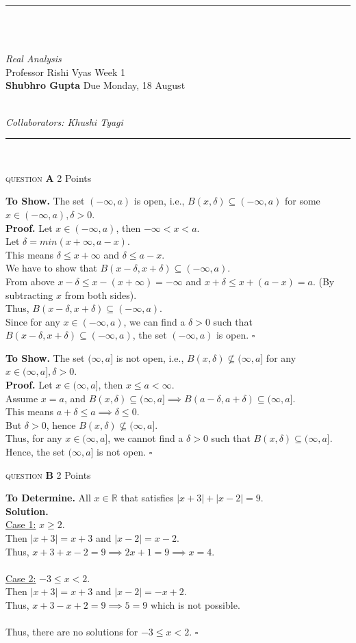 \documentclass[11pt]{article}
\newcommand{\problem
}[2]{
\begin{mdframed}
    \textsc{question} \textbf{#1} \hfill #2
\end{mdframed}
}
\newcommand{\heading}[5]{
\hrule ~\\~\\
\begin{large}
\noindent\emph{#1}\smallskip ~\\
Professor #3 \hfill Week #2 \smallskip ~\\
\textbf{Shubhro Gupta} \hfill Due #4 ~\\
\end{large} \medskip ~\\
{\emph{Collaborators: #5}}~\\
\hrule
\vspace{50pt}
~\\
}
\begin{document}
\heading{Real Analysis}{1}{Rishi Vyas}{Monday, 18 August}{Khushi Tyagi}

\problem{A}{2 Points}
\textbf{To Show.} The set $(- \infty, a)$ is open, i.e., $B(x, \delta) \subseteq (- \infty, a)$ for some $ x \in (- \infty, a), \delta > 0$.\\
\textbf{Proof.} Let $x \in (- \infty, a)$, then $- \infty < x < a$.\\
Let $\delta = min(x + \infty, a - x)$.\\
This means $\delta \leq x + \infty$ and $\delta \leq a - x$.\\
We have to show that $B(x - \delta, x + \delta) \subseteq (- \infty, a)$.\\
From above $x - \delta \leq x  - (x + \infty) = - \infty$ and $x + \delta \leq x + (a - x) = a$. (By subtracting $x$ from both sides).\\
Thus, $B(x - \delta, x + \delta) \subseteq (- \infty, a)$.\\
Since for any $x \in (- \infty, a)$, we can find a $\delta > 0$ such that $B(x - \delta, x + \delta) \subseteq (- \infty, a)$, the set $(- \infty, a)$ is open. \hfill $\square$\\
\vspace{10pt}

\noindent \textbf{To Show.} The set $(\infty, a]$ is not open, i.e., $B(x, \delta) \not\subseteq (\infty, a]$ for any $ x \in (\infty, a], \delta > 0$.\\
\textbf{Proof.} Let $x \in (\infty, a]$, then $x \leq a < \infty$.\\
Assume $x = a$, and $B(x, \delta) \subseteq (\infty, a] \implies B(a - \delta, a + \delta) \subseteq (\infty, a]$.\\
This means $a + \delta \leq a \implies \delta \leq 0$.\\
But $\delta > 0$, hence $B(x, \delta) \not\subseteq (\infty, a]$.\\
Thus, for any $x \in (\infty, a]$, we cannot find a $\delta > 0$ such that $B(x, \delta) \subseteq (\infty, a]$. Hence, the set $(\infty, a]$ is not open. \hfill $\square$\\




\problem{B}{2 Points}
\textbf{To Determine. } All $x \in \mathbb{R}$ that satisfies $|x + 3| + |x - 2| = 9$.\\
\textbf{Solution.} \\
\underline{Case 1:} $x \geq 2$.\\
Then $|x + 3| = x + 3$ and $|x - 2| = x - 2$.\\
Thus, $x + 3 + x - 2 = 9 \implies 2x + 1 = 9 \implies x = 4$.\\
\\
\noindent \underline{Case 2:} $-3 \leq x < 2$.\\
Then $|x + 3| = x + 3$ and $|x - 2| = -x + 2$.\\
Thus, $x + 3 - x + 2 = 9 \implies 5 = 9$ which is not possible.\\
\\
Thus, there are no solutions for $-3 \leq x < 2$. \hfill $\square$\\
\end{document}
